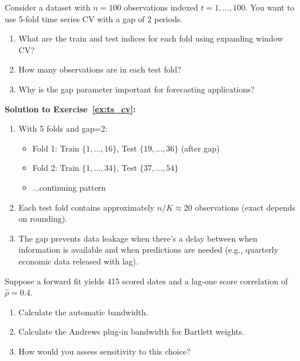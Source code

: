 \begin{exercise}
\label{ex:ts_cv}
Consider a dataset with $n=100$ observations indexed $t=1,\ldots,100$. You want to use 5-fold time series CV with a gap of 2 periods.

\begin{enumerate}
    \item[(a)] What are the train and test indices for each fold using expanding window CV?
    \item[(b)] How many observations are in each test fold?
    \item[(c)] Why is the gap parameter important for forecasting applications?
\end{enumerate}
\end{exercise}

\textbf{Solution to Exercise~\ref{ex:ts_cv}:}

\begin{enumerate}
    \item[(a)] With 5 folds and gap=2:
    \begin{itemize}
        \item Fold 1: Train $\{1,\ldots,16\}$, Test $\{19,\ldots,36\}$ (after gap)
        \item Fold 2: Train $\{1,\ldots,34\}$, Test $\{37,\ldots,54\}$
        \item ...continuing pattern
    \end{itemize}

    \item[(b)] Each test fold contains approximately $n/K \approx 20$ observations (exact depends on rounding).

    \item[(c)] The gap prevents data leakage when there's a delay between when information is available and when predictions are needed (e.g., quarterly economic data released with lag).
\end{enumerate}

\begin{exercise}
\label{ex:hac_bandwidth}
Suppose a forward fit yields 415 scored dates and a lag-one score correlation of $\hat\rho=0.4$.

\begin{enumerate}
    \item[(a)] Calculate the automatic bandwidth.
    \item[(b)] Calculate the Andrews plug-in bandwidth for Bartlett weights.
    \item[(c)] How would you assess sensitivity to this choice?
\end{enumerate}
\end{exercise}

